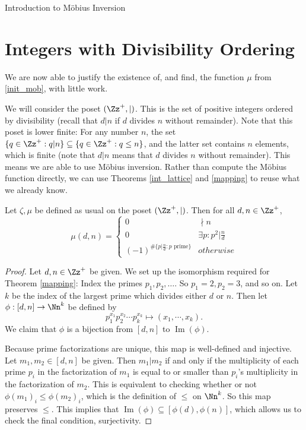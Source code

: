 \documentclass[12pt]{pom_thesis}
\DeclareMathOperator{\im}{Im}
\begin{document}
\begin{chapter}{Introduction to M\"obius Inversion}
\section{Integers with Divisibility Ordering}
We are now able to justify the existence of, and find, the function $\mu$ from \eqref{init_mob}, with little work.

We will consider the poset $(\Zz^{+}, |)$. This is the set of positive integers ordered by divisibility (recall that $d|n$ if $d$ divides $n$ without remainder). Note that this poset is lower finite: For any number $n$, the set $\{q \in \Zz^{+}: q|n\} \subseteq \{q \in \Zz^{+}: q \leq n\}$, and the latter set contains $n$ elements, which is finite (note that $d|n$ means that $d$ divides $n$ without remainder). This means we are able to use M\"obius inversion. Rather than compute the M\"obius function directly, we can use Theorems \ref{int_lattice} and \ref{mapping} to reuse what we already know.

\begin{thm}\label{mu_div}
Let $\zeta, \mu$ be defined as usual on the poset $(\Zz^+, |)$. Then for all $d,n \in \Zz^+$,
\[
\mu(d,n) =
\begin{cases}
0 & \nmid n \\
0 & \exists p: p^2|\frac nd\\
(-1)^{\#\{p|\frac nd : p \text{ prime}\}} & otherwise
\end{cases}
\]
\end{thm}

\begin{proof}
Let $d,n \in \Zz^+$ be given. We set up the isomorphism required for Theorem \ref{mapping}: Index the primes $p_1, p_2, \dots$. So $p_1=2, p_2=3$, and so on. Let $k$ be the index of the largest prime which divides either $d$ or $n$. Then let $\phi : [d,n] \rightarrow \Nn^k$ be defined by
\[
 p_1^{x_1}p_2^{x_2}\cdots p_k^{x_k} \mapsto (x_1, \cdots, x_k).
\]
We claim that $\phi$ is a bijection from $[d,n]$ to $\im(\phi)$.

Because prime factorizations are unique, this map is well-defined and injective. Let $m_1, m_2 \in [d,n]$ be given. Then $m_1|m_2$ if and only if the multiplicity of each prime $p_i$ in the factorization of $m_1$ is equal to or smaller than $p_i$'s multiplicity in the factorization of $m_2$. This is equivalent to checking whether or not $\phi(m_1)_i \leq \phi(m_2)_i$, which is the definition of $\leq$ on $\Nn^k$. So this map preserves $\leq$. This implies that $\im(\phi) \subseteq [\phi(d), \phi(n)]$, which allows us to check the final condition, surjectivity. 


\end{proof}
\end{chapter}
\end{document}
